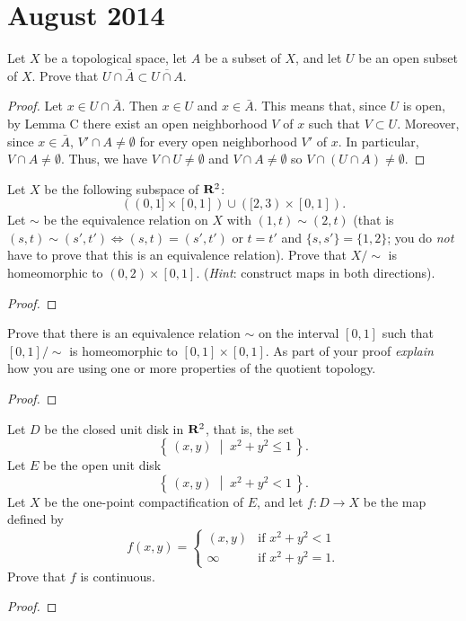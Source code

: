 \chapter{August 2014}
\begin{problem}
Let $X$ be a topological space, let $A$ be a subset of $X$, and let $U$ be
an open subset of $X$. Prove that $U\cap \bar A\subset\overline{U\cap A}$.
\end{problem}
\begin{proof}
Let $x\in U\cap\bar A$. Then $x\in U$ and $x\in\bar A$. This means that,
since $U$ is open, by Lemma C there exist an open neighborhood $V$ of $x$
such that $V\subset U$. Moreover, since $x\in\bar A$, $V'\cap
A\neq\emptyset$ for every open neighborhood $V'$ of $x$. In particular,
$V\cap A\neq\emptyset$. Thus, we have $V\cap U\neq\emptyset$ and $V\cap
A\neq\emptyset$ so $V\cap(U\cap A)\neq\emptyset$.
\end{proof}

\begin{problem}
Let $X$ be the following subspace of $\mathbf{R}^2$:
\[
((0,1]\times[0,1])\cup([2,3)\times[0,1]).
\]
Let $\sim$ be the equivalence relation on $X$ with $(1,t)\sim(2,t)$ (that
is $(s,t)\sim(s',t')\iff(s,t)=(s',t')$ or $t=t'$ and $\{s,s'\}=\{1,2\}$;
you do \emph{not} have to prove that this is an equivalence
relation). Prove that $X/{\sim}$ is homeomorphic to
$(0,2)\times[0,1]$. (\emph{Hint}: construct maps in both directions).
\end{problem}
\begin{proof}
\end{proof}

\begin{problem}
Prove that there is an equivalence relation $\sim$ on the interval $[0,1]$
such that $[0,1]/{\sim}$ is homeomorphic to $[0,1]\times[0,1]$. As part of
your proof \emph{explain} how you are using one or more properties of the
quotient topology.
\end{problem}
\begin{proof}
\end{proof}

\begin{problem}
Let $D$ be the closed unit disk in $\mathbf{R}^2$, that is, the set
\[
\left\{\,(x,y)\;\middle|\;x^2+y^2\leq 1\,\right\}.
\]
Let $E$ be the open unit disk
\[
\left\{\,(x,y)\;\middle|\;x^2+y^2<1\,\right\}.
\]
Let $X$ be the one-point compactification of $E$, and let $f\colon D\to X$
be the map defined by
\[
f(x,y)=
\begin{cases}
(x,y)&\text{if $x^2+y^2<1$}\\
\infty&\text{if $x^2+y^2=1$.}
\end{cases}
\]
Prove that $f$ is continuous.
\end{problem}
\begin{proof}
\end{proof}

